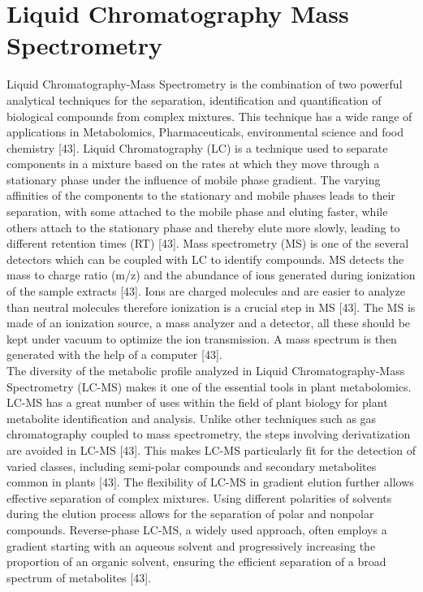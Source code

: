 \documentclass[12pt,a4paper]{article}
\begin{document}
\section{Liquid Chromatography Mass Spectrometry}
Liquid Chromatography-Mass Spectrometry is the combination of two powerful analytical techniques for the separation, identification and quantification of biological compounds from complex mixtures. This technique has a wide range of applications in Metabolomics, Pharmaceuticals, environmental science and food chemistry [43]. Liquid Chromatography (LC) 
is a technique used to separate components in a mixture based on the rates at which they move through a stationary phase under the influence of mobile phase gradient. The varying affinities of the components to the stationary and mobile phases leads to their separation, with some attached to the mobile phase and eluting faster, while others attach to 
the stationary phase and thereby elute more slowly, leading to different retention times (RT) [43]. Mass spectrometry (MS) is one of the several detectors which can be coupled with LC to identify compounds. MS detects the mass to charge ratio (m/z) and the abundance of ions generated during ionization of the sample extracts [43]. Ions are charged molecules 
and are easier to analyze than neutral molecules therefore ionization is a crucial step in MS [43]. The MS is made of an ionization source, a mass analyzer and a detector, all these should be kept under vacuum to optimize the ion transmission. A mass spectrum is then generated with the help of a computer [43]. \\

The diversity of the metabolic profile analyzed in Liquid Chromatography-Mass Spectrometry (LC-MS) makes it one of the essential tools in plant metabolomics. LC-MS has a great number of uses within the field of plant biology for plant metabolite identification and analysis. Unlike other techniques such as gas chromatography coupled to mass spectrometry, 
the steps involving derivatization are avoided in LC-MS [43]. This makes LC-MS particularly fit for the detection of varied classes, including semi-polar compounds and secondary metabolites common in plants [43]. The flexibility of LC-MS in gradient elution further allows effective separation of complex mixtures. Using different polarities of solvents 
during the elution process allows for the separation of polar and nonpolar compounds. Reverse-phase LC-MS, a widely used approach, often employs a gradient starting with an aqueous solvent and progressively increasing the proportion of an organic solvent, ensuring the efficient separation of a broad spectrum of metabolites [43]. \\
\end{document}
